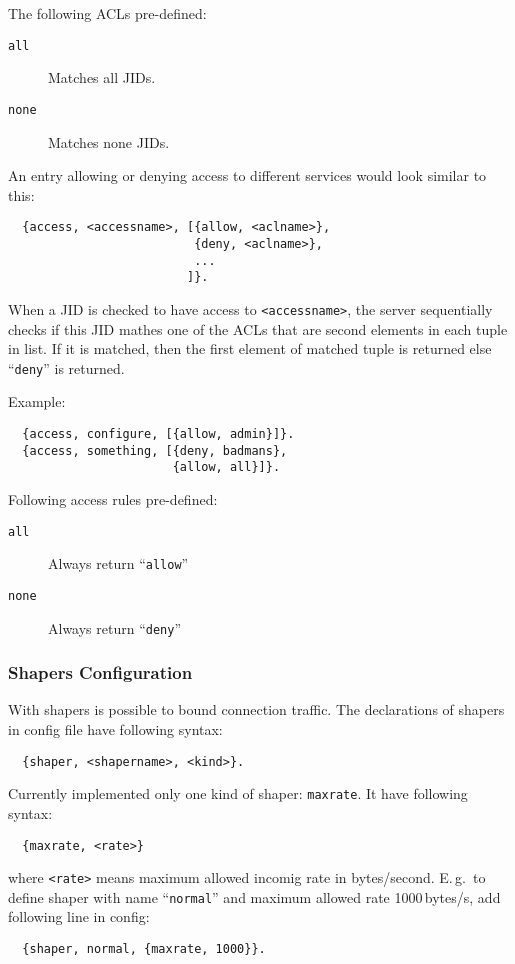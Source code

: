\documentclass[a4paper,10pt]{article}
\newcommand{\bracehack}{\def\{{\char"7B}\def\}{\char"7D}}
\newcommand{\term}[1]{\texttt{#1}}
\newcommand{\titem}[1]{\item[\bracehack\texttt{#1}]}
\begin{document}
The following ACLs pre-defined:
\begin{description}
\titem{all} Matches all JIDs.
\titem{none} Matches none JIDs.
\end{description}

An entry allowing or denying access to different services would look similar to
this:
\begin{verbatim}
  {access, <accessname>, [{allow, <aclname>},
                          {deny, <aclname>},
                          ...
                         ]}.
\end{verbatim}
When a JID is checked to have access to \term{<accessname>}, the server
sequentially checks if this JID mathes one of the ACLs that are second elements
in each tuple in list.  If it is matched, then the first element of matched
tuple is returned else ``\term{deny}'' is returned.

Example:
\begin{verbatim}
  {access, configure, [{allow, admin}]}.
  {access, something, [{deny, badmans},
                       {allow, all}]}.
\end{verbatim}

Following access rules pre-defined:
\begin{description}
\titem{all} Always return ``\term{allow}''
\titem{none} Always return ``\term{deny}''
\end{description}


\subsubsection{Shapers Configuration}
\label{sec:configshaper}

With shapers is possible to bound connection traffic.  The declarations of
shapers in config file have following syntax:
\begin{verbatim}
  {shaper, <shapername>, <kind>}.
\end{verbatim}
Currently implemented only one kind of shaper: \term{maxrate}.  It have
following syntax:
\begin{verbatim}
  {maxrate, <rate>}
\end{verbatim}
where \term{<rate>} means maximum allowed incomig rate in bytes/second.
E.\,g.\ to define shaper with name ``\term{normal}'' and maximum allowed rate
1000\,bytes/s, add following line in config:
\begin{verbatim}
  {shaper, normal, {maxrate, 1000}}.
\end{verbatim}
\end{document}
